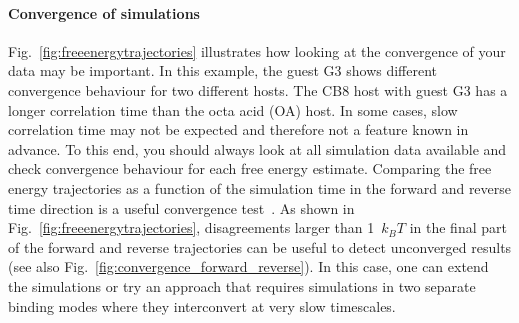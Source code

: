 \documentclass[9pt,bestpractices]{livecoms}
\begin{document}
\paragraph{Convergence of simulations}
Fig.~\ref{fig:freeenergytrajectories} illustrates how looking at the convergence of your data may be important. In this example, the guest G3 shows different convergence behaviour for two different hosts. The CB8 host with guest G3 has a longer correlation time than the octa acid (OA) host. In some cases, slow correlation time may not be expected and therefore not a feature known in advance. To this end, you should always look at all simulation data available and check convergence behaviour for each free energy estimate.
Comparing the free energy trajectories as a function of the simulation time in the forward and reverse time direction is a useful convergence test~\cite{klimovich2015guidelines}.
As shown in Fig.~\ref{fig:freeenergytrajectories}, disagreements larger than 1~$k_{B}T$ in the final part of the forward and reverse trajectories can be useful to detect unconverged results (see also Fig.~\ref{fig:convergence_forward_reverse}).
In this case, one can extend the simulations or try an approach that requires simulations in two separate binding modes where they interconvert at very slow timescales.  
\end{document}
